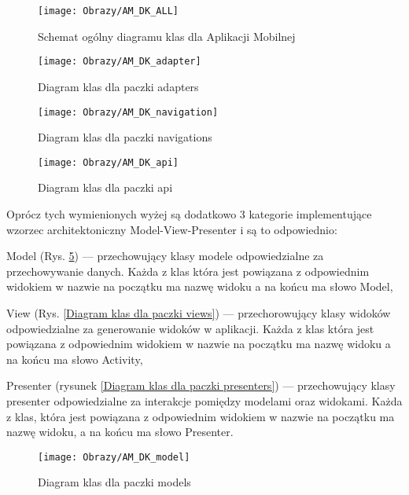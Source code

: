 	\begin{figure}[ht!]
		\centering
		\vspace{-0.6cm}
		\texttt{[image: Obrazy/AM\_DK\_ALL]}
		\caption{Schemat ogólny diagramu klas dla Aplikacji Mobilnej}
		\label{Schemat ogólny diagramu klas dla Aplikacji mobilnej}
	\end{figure}
	\newpage
\begin{figure}[ht!]
	\centering
	\texttt{[image: Obrazy/AM\_DK\_adapter]}
	\caption{Diagram klas dla paczki adapters}
	\label{Diagram klas dla paczki adapters}
\end{figure}
\newpage
\begin{figure}[ht!]
	\centering
	\texttt{[image: Obrazy/AM\_DK\_navigation]}
	\caption{Diagram klas dla paczki navigations}
	\label{Diagram klas dla paczki navigations}
\end{figure}
\newpage
\begin{figure}[ht!]
	\centering
	\texttt{[image: Obrazy/AM\_DK\_api]}
	\caption{Diagram klas dla paczki api}
	\label{Diagram klas dla paczki api}
\end{figure}
\newpage
Oprócz tych wymienionych wyżej są dodatkowo 3 kategorie implementujące wzorzec architektoniczny Model-View-Presenter i są to odpowiednio:
\begin{itemize*}
	\item Model (Rys. \ref{Diagram klas dla paczki models}) 
				 --- przechowujący klasy modele odpowiedzialne za przechowywanie danych. Każda z klas która jest powiązana z odpowiednim widokiem   w nazwie na początku ma nazwę widoku a na końcu ma słowo Model,   
				\item View 
				(Rys. \ref{Diagram klas dla paczki views}) 
				--- przechorowujący klasy widoków odpowiedzialne za generowanie widoków w aplikacji. Każda z klas która jest powiązana z odpowiednim widokiem   w nazwie na początku ma nazwę widoku a na końcu ma słowo Activity, 
				\item Presenter
				(rysunek \ref{Diagram klas dla paczki presenters}) 
				 --- przechowujący klasy presenter odpowiedzialne za interakcje pomiędzy modelami oraz widokami. Każda z klas, która jest powiązana z odpowiednim widokiem w nazwie na początku ma nazwę widoku, a na końcu ma słowo Presenter.\cite{And}
\end{itemize*}
		\newpage
	\begin{figure}[ht!]
		\centering
		\texttt{[image: Obrazy/AM\_DK\_model]}
		\caption{Diagram klas dla paczki models}
		\label{Diagram klas dla paczki models}
	\end{figure}

